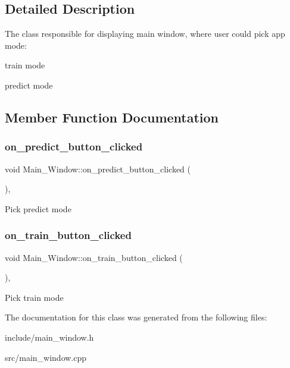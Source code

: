 \subsection{Detailed Description}
The class responsible for displaying main window, where user could pick app mode\+: 


\begin{DoxyItemize}
\item train mode
\item predict mode 
\end{DoxyItemize}

\subsection{Member Function Documentation}
\mbox{\label{classMain__Window_a152cfc3e430cff4fb23f07ef43afaeb5}} 
\subsubsection{\texorpdfstring{on\+\_\+predict\+\_\+button\+\_\+clicked}{on\_predict\_button\_clicked}}
{\footnotesize\ttfamily void Main\+\_\+\+Window\+::on\+\_\+predict\+\_\+button\+\_\+clicked (\begin{DoxyParamCaption}{ }\end{DoxyParamCaption})\hspace{0.3cm}{\ttfamily [private]}, {\ttfamily [slot]}}

Pick predict mode \mbox{\label{classMain__Window_a4081b8f068e82535e5a0f00924221c21}} 
\subsubsection{\texorpdfstring{on\+\_\+train\+\_\+button\+\_\+clicked}{on\_train\_button\_clicked}}
{\footnotesize\ttfamily void Main\+\_\+\+Window\+::on\+\_\+train\+\_\+button\+\_\+clicked (\begin{DoxyParamCaption}{ }\end{DoxyParamCaption})\hspace{0.3cm}{\ttfamily [private]}, {\ttfamily [slot]}}

Pick train mode 

The documentation for this class was generated from the following files\+:\begin{DoxyCompactItemize}
\item 
include/main\+\_\+window.\+h\item 
src/main\+\_\+window.\+cpp\end{DoxyCompactItemize}
